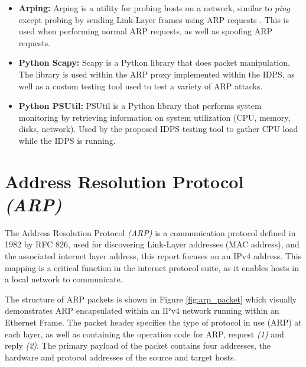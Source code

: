 \documentclass[12pt, oneside]{book}
\begin{document}
\begin{itemize}
  \item \textbf{Arping:} Arping is a utility for probing hosts on a network, similar to \emph{ping} except
    probing by sending Link-Layer frames using ARP requests \cite{kuznetsov}. This is used when performing normal ARP requests,
    as well as spoofing ARP requests.
  \item \textbf{Python Scapy:} Scapy is a Python library that does packet manipulation\cite{Scapylib}. The library
    is used within the ARP proxy implemented within the IDPS, as well as a custom testing tool used to test a variety of ARP attacks.
  \item \textbf{Python PSUtil:} PSUtil is a Python library that performs system monitoring by retrieving information on
     system utilization (CPU, memory, disks, network)\cite{rodola}. Used by the proposed IDPS testing tool
     to gather CPU load while the IDPS is running.
\end{itemize}

\newpage

\section{Address Resolution Protocol \emph{(ARP)}}
\label{sec:ARP}
The Address Resolution Protocol \emph{(ARP)} is a communication protocol defined in 1982 by RFC 826,\cite{plummer2008rfc}
used for discovering Link-Layer addresses (MAC address),
and the associated internet layer address, this report focuses on an IPv4 address.
This mapping is a critical function in the internet protocol
suite, as it enables hosts in a local network to communicate.

The structure of ARP packets is shown in Figure \ref{fig:arp_packet} which visually demonstrates
ARP encapsulated within an IPv4 network running within an Ethernet Frame.
The packet header specifies the type of protocol in use (ARP) at
each layer, as well as containing the operation code for ARP, request \emph{(1)} and
reply \emph{(2)}.
The primary payload of the packet contains four addresses, the hardware and protocol addresses of the source and target hosts.
\end{document}
